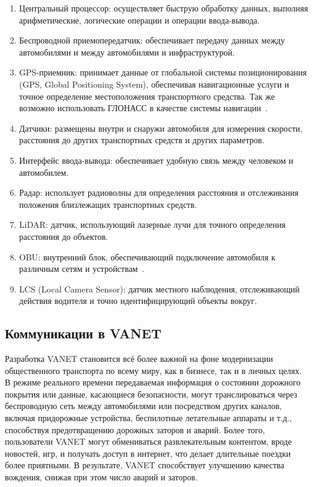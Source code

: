 \begin{enumerate}
    \item Центральный процессор: осуществляет быструю обработку данных, выполняя арифметические, логические операции и операции ввода-вывода.
    \item Беспроводной приемопередатчик: обеспечивает передачу данных между автомобилями и между автомобилями и инфраструктурой.
    \item GPS-приемник: принимает данные от глобальной системы позиционирования (GPS, Global Positioning System), обеспечивая навигационные услуги и точное определение местоположения транспортного средства. Так же возможно использовать ГЛОНАСС в качестве системы навигации~\cite{savelyev2018vanet}. 
    \item Датчики: размещены внутри и снаружи автомобиля для измерения скорости, расстояния до других транспортных средств и других параметров.
    \item Интерфейс ввода-вывода: обеспечивает удобную связь между человеком и автомобилем.
    \item Радар: использует радиоволны для определения расстояния и отслеживания положения близлежащих транспортных средств.
    \item LiDAR: датчик, использующий лазерные лучи для точного определения расстояния до объектов.
    \item OBU: внутренний блок, обеспечивающий подключение автомобиля к различным сетям и устройствам~\cite{truong2015software}.
    \item LCS (Local Camera Sensor): датчик местного наблюдения, отслеживающий действия водителя и точно идентифицирующий объекты вокруг.
\end{enumerate}

\subsection{Коммуникации в VANET}

Разработка VANET становится всё более важной на фоне модернизации общественного транспорта по всему миру, как в бизнесе, так и в личных целях. В режиме реального времени передаваемая информация о состоянии дорожного покрытия или данные, касающиеся безопасности, могут транслироваться через беспроводную сеть между автомобилями или посредством других каналов, включая придорожные устройства, беспилотные летательные аппараты и т.д., способствуя предотвращению дорожных заторов и аварий. Более того, пользователи VANET могут обмениваться развлекательным контентом, вроде новостей, игр, и получать доступ в интернет, что делает длительные поездки более приятными. В результате, VANET способствует улучшению качества вождения, снижая при этом число аварий и заторов.

